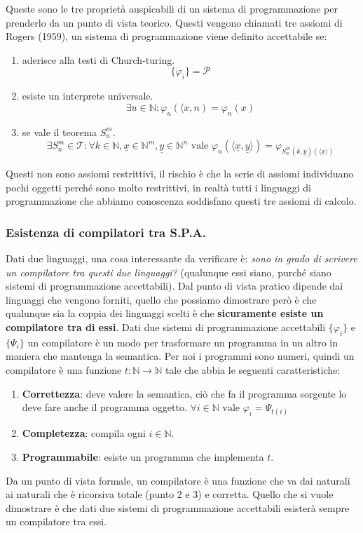 \documentclass{article}
\begin{document}
Queste sono le tre proprietà auspicabili di un sistema di programmazione per prenderlo da un punto
di vista teorico. Questi vengono chiamati tre assiomi di Rogers (1959), un sistema di programmazione viene
definito accettabile se:
\begin{enumerate}
    \item aderisce alla testi di Church-turing.$$\{\varphi_i\}=\mathcal{P}$$
    \item esiste un interprete universale.$$\exists u\in\mathbb{N}:\varphi_u\left(\langle x,n\right)=\varphi_n(x)$$
    \item se vale il teorema $S_n^m$.$$\exists S_n^m\in\mathcal{T}:\forall k\in\mathbb{N},\underline{x}\in\mathbb{N}^m,\underline{y}\in\mathbb{N}^n\text{ vale }\varphi_n\left(\langle\underline{x},\underline{y}\rangle\right)=\varphi_{S_n^m(k,\underline{y})(\langle\underline{x}\rangle)}$$
\end{enumerate}
Questi non sono assiomi restrittivi, il rischio è che la serie di assiomi individuano pochi oggetti
perché sono molto restrittivi, in realtà tutti i linguaggi di programmazione che abbiamo
conoscenza soddisfano questi tre assiomi di calcolo.

\subsubsection{Esistenza di compilatori tra S.P.A.}
Dati due linguaggi, una cosa interessante da verificare è: \textit{sono in grado di scrivere
    un compilatore tra questi due linguaggi?} (qualunque essi siano, purché siano sistemi di programmazione
accettabili). Dal punto di vista pratico dipende dai linguaggi che vengono forniti, quello che possiamo
dimostrare però è che qualunque sia la coppia dei linguaggi scelti è che \textbf{sicuramente
    esiste un compilatore tra di essi}.
Dati due sistemi di programmazione accettabili $\{\varphi_i\}$ e $\{\Psi_i\}$ un compilatore è un modo
per trasformare un programma in un altro in maniera che mantenga la semantica. Per noi i
programmi sono numeri, quindi un compilatore è una funzione $t:\mathbb{N}\rightarrow\mathbb{N}$
tale che abbia le seguenti caratteristiche:
\begin{enumerate}
    \item \textbf{Correttezza}: deve valere la semantica, ciò che fa il programma sorgente
          lo deve fare anche il programma oggetto. $\forall i\in\mathbb{N}\text{ vale }\varphi_i=\Psi_{t(i)}$
    \item \textbf{Completezza}: compila ogni $i\in\mathbb{N}$.
    \item \textbf{Programmabile}: esiste un programma che implementa $t$.
\end{enumerate}
Da un punto di vista formale, un compilatore è una funzione che va dai naturali ai naturali che
è ricorsiva totale (punto 2 e 3) e corretta. Quello che si vuole dimostrare è che dati due sistemi di programmazione accettabili
esisterà sempre un compilatore tra essi.
\end{document}
